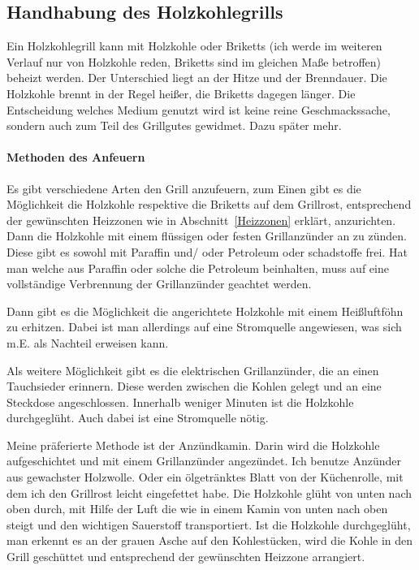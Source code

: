 \subsection{Handhabung des Holzkohlegrills}

	Ein Holzkohlegrill kann mit Holzkohle oder Briketts (ich werde im weiteren 
	Verlauf nur von Holzkohle reden, Briketts sind im 
	gleichen Maße 
	betroffen) beheizt werden. 
	Der Unterschied liegt an der Hitze und der Brenndauer. Die Holzkohle brennt in 
	der Regel heißer, die Briketts dagegen länger. 
	Die Entscheidung welches Medium genutzt wird ist keine reine 
	Geschmackssache, sondern auch zum Teil des Grillgutes 
	gewidmet. Dazu später 
	mehr.

	\paragraph{Methoden des Anfeuern}

	Es gibt verschiedene Arten den Grill anzufeuern, zum Einen gibt es die 
	Möglichkeit die Holzkohle respektive die Briketts auf 
	dem Grillrost,
	entsprechend der gewünschten Heizzonen wie in Abschnitt~\vref{Heizzonen} 
	erklärt, anzurichten. Dann die Holzkohle mit 
	einem flüssigen oder 
	festen Grillanzünder
	an zu zünden. Diese gibt es sowohl mit Paraffin und/ oder Petroleum oder 
	schadstoffe frei. Hat man welche aus Paraffin oder 
	solche die Petroleum 
	beinhalten, muss auf eine 
	vollständige Verbrennung der Grillanzünder geachtet werden.
	
	Dann gibt es die Möglichkeit die angerichtete Holzkohle mit einem Heißluftföhn 
	zu erhitzen. Dabei ist man allerdings auf eine 
	Stromquelle 
	angewiesen, was sich m.E. als Nachteil
	erweisen kann.
	
	Als weitere Möglichkeit gibt es die elektrischen Grillanzünder, die an einen 
	Tauchsieder erinnern. Diese werden zwischen die 
	Kohlen gelegt und an 
	eine Steckdose angeschlossen. 
	Innerhalb weniger Minuten ist die Holzkohle durchgeglüht. Auch dabei ist eine 
	Stromquelle nötig.
	
	Meine präferierte Methode ist der Anzündkamin.  Darin wird die Holzkohle 
	aufgeschichtet und mit einem Grillanzünder 
	angezündet. Ich benutze 
	Anzünder aus gewachster Holzwolle. 
	Oder ein ölgetränktes Blatt von der Küchenrolle, mit dem ich den Grillrost leicht 
	eingefettet habe. Die Holzkohle glüht von unten nach oben 
	durch, mit Hilfe der 
	Luft die wie in einem Kamin von unten nach oben steigt
	und den wichtigen Sauerstoff transportiert. Ist die Holzkohle durchgeglüht, 
	man erkennt es an der grauen Asche auf den 
	Kohlestücken, wird die 
	Kohle in den Grill geschüttet und 
	entsprechend der gewünschten Heizzone arrangiert.

